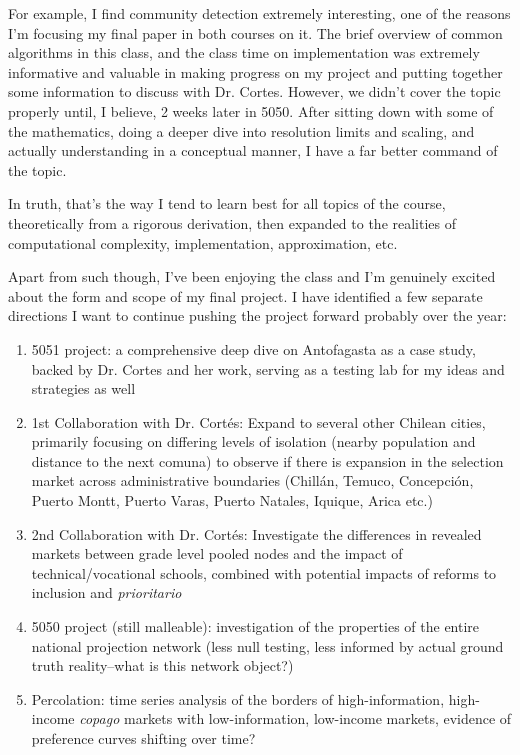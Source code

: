 \documentclass{article}
\begin{document}
For example, I find community detection extremely interesting, one of the reasons I'm focusing my final paper in both courses on it. The brief overview of common algorithms in this class, and the class time on implementation was extremely informative and valuable in making progress on my project and putting together some information to discuss with Dr. Cortes. However, we didn't cover the topic properly until, I believe, 2 weeks later in 5050. After sitting down with some of the mathematics, doing a deeper dive into resolution limits and scaling, and actually understanding in a conceptual manner, I have a far better command of the topic. 

In truth, that's the way I tend to learn best for all topics of the course, theoretically from a rigorous derivation, then expanded to the realities of computational complexity, implementation, approximation, etc. 

Apart from such though, I've been enjoying the class and I'm genuinely excited about the form and scope of my final project. I have identified a few separate directions I want to continue pushing the project forward probably over the year:
\begin{enumerate}
    \item 5051 project: a comprehensive deep dive on Antofagasta as a case study, backed by Dr. Cortes and her work, serving as a testing lab for my ideas and strategies as well
    \item 1st Collaboration with Dr. Cortés: Expand to several other Chilean cities, primarily focusing on differing levels of isolation (nearby population and distance to the next comuna) to observe if there is expansion in the selection market across administrative boundaries (Chillán, Temuco, Concepción, Puerto Montt, Puerto Varas, Puerto Natales, Iquique, Arica etc.)
    \item 2nd Collaboration with Dr. Cortés: Investigate the differences in revealed markets between grade level pooled nodes and the impact of technical/vocational schools, combined with potential impacts of reforms to inclusion and \textit{prioritario}
    \item 5050 project (still malleable): investigation of the properties of the entire national projection network (less null testing, less informed by actual ground truth reality--what is this network object?)
    \item Percolation: time series analysis of the borders of high-information, high-income \textit{copago} markets with low-information, low-income markets, evidence of preference curves shifting over time?
\end{enumerate}
\end{document}
